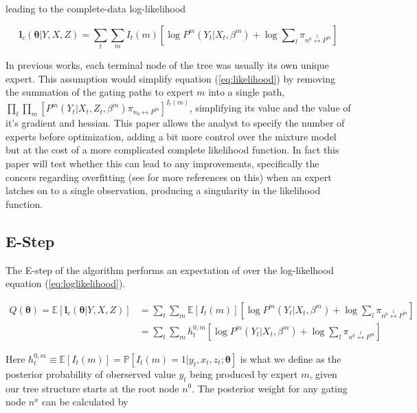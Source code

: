 \documentclass[12pt]{article}
\newcommand{\sumgateprod}[3]{\pi_{#1 \overset{#3}{\longleftrightarrow} #2}}
\newcommand{\shortsum}[1]{\sum \nolimits_{#1}}
\begin{document}
leading to the complete-data log-likelihood

\begin{equation}  \label{eq:loglikelihood}
  \boldsymbol{l}_{c}(\boldsymbol{\theta}|Y, X, Z) = \sum_{t} \sum_{m} I_{t}(m) \left[\log P^{m}(Y_{t}|X_{t},\beta^{m}) + \log \shortsum{l} \sumgateprod{n^{0}}{P^{m}}{l} \right]
\end{equation}

In previous works, each terminal node of the tree was usually its own unique
expert. This assumption would simplify equation (\ref{eq:likelihood})
by removing the summation of the gating paths to expert $m$ into a 
single path,
$\prod_{t}\prod_{m}[P^{m}(Y_{t}|X_{t}, Z_{t}, \beta^{m}) \pi_{n_{0} \longleftrightarrow P^{m}}]^{I_{t}(m)}$,
simplifying its value and the value of it's gradient and hessian. This paper
allows the analyst to specify the number of experts before optimization,
adding a bit more control over the mixture model but at the cost of a more
complicated complete likelihood function. In fact this paper will test whether
this can lead to any improvements, specifically the concers regarding overfitting
(see \cite{BishopSvenson2003} for more references on this) when an expert latches
on to a single observation, producing a singularity in the likelihood function.


\subsection{E-Step}
The E-step of the algorithm performs an expectation of over the log-likelhood
equation (\ref{eq:loglikelihood}).

\begin{equation} \label{eq:Estep}
  \begin{split}
  Q(\boldsymbol{\theta}) = \mathbb{E} \left [ \boldsymbol{l}_{c}(\boldsymbol{\theta}|Y,X,Z) \right] & = \sum_{t}\sum_{m} \mathbb{E} \left[ I_{t}(m) \right] \left[ \log P^{m}(Y_{t}|X_{t}, \beta^{m}) + \log \shortsum{l} \sumgateprod{n^{0}}{P^{m}}{l} \right] \\ 
   & = \sum_{t} \sum_{m} h^{0,m}_{t} \left[ \log P^{m}(Y_{t}|X_{t},\beta^{m}) + \log \shortsum{l} \sumgateprod{n^{0}}{P^{m}}{l} \right]
 \end{split}
\end{equation}

Here $h^{0,m}_{t} \equiv \mathbb{E}\left[I_{t}(m)\right] = \mathbb{P}[I_{t}(m) = 1| y_{t}, x_{t}, z_{t}; \boldsymbol{\theta}]$
is what we define as the posterior probability of oberserved value $y_{t}$ being
produced by expert $m$, given our tree structure starts at the root node $n^{0}$.
The posterior weight for any gating node $n^{a}$ can be calculated by
\end{document}
